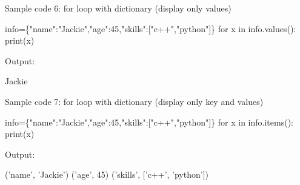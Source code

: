 \begin{flushleft}
	\bigskip	
	Sample code 6: for loop with dictionary (display only values)
	\begin{tcolorbox}[breakable,notitle,boxrule=-0pt,colback=code,colframe=code]
		\color{white}
		\font=8pt
		info=\{"name":"Jackie","age":45,"skills":["c++","python"]\} \newline
		for x in info.values(): \newline
		\hphantom{} \hphantom{}	print(x)
		\font=4pt
	\end{tcolorbox}
	
	Output:
	\begin{tcolorbox}[breakable,notitle,boxrule=-0pt,colback=output,colframe=output]
		\color{black}
		Jackie  \newline
		['c++', 'python']
		\font=4pt
	\end{tcolorbox}
	
	\bigskip	
	Sample code 7: for loop with dictionary (display only key and values)
	\begin{tcolorbox}[breakable,notitle,boxrule=-0pt,colback=code,colframe=code]
		\color{white}
		\font=8pt
		info=\{"name":"Jackie","age":45,"skills":["c++","python"]\} \newline
		for x in info.items(): \newline
		\hphantom{} \hphantom{}	print(x)
		\font=4pt
	\end{tcolorbox}
	
	Output:
	\begin{tcolorbox}[breakable,notitle,boxrule=-0pt,colback=output,colframe=output]
		\color{black}
		('name', 'Jackie') \newline
		('age', 45) \newline
		('skills', ['c++', 'python'])
		\font=4pt
	\end{tcolorbox}
	
\end{flushleft}

\newpage

